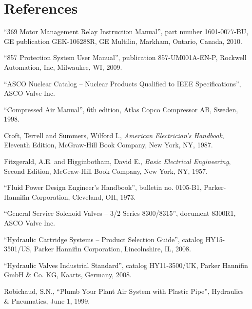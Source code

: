 \filbreak
\section*{References}


\noindent
``369 Motor Management Relay Instruction Manual'', part number 1601-0077-BU, GE publication GEK-106288R, GE Multilin, Markham, Ontario, Canada, 2010.

\vskip 10pt

\noindent
``857 Protection System User Manual'', publication 857-UM001A-EN-P, Rockwell Automation, Inc, Milwaukee, WI, 2009.

\vskip 10pt

\noindent
``ASCO Nuclear Catalog -- Nuclear Products Qualified to IEEE Specifications'', ASCO Valve Inc.

\vskip 10pt

\noindent
``Compressed Air Manual'', 6th edition, Atlas Copco Compressor AB, Sweden, 1998.

\vskip 10pt

\noindent
Croft, Terrell and Summers, Wilford I., \textit{American Electrician's Handbook}, Eleventh Edition, McGraw-Hill Book Company, New York, NY, 1987.

\vskip 10pt

\noindent
Fitzgerald, A.E. and Higginbotham, David E., \textit{Basic Electrical Engineering}, Second Edition, McGraw-Hill Book Company, New York, NY, 1957.

\vskip 10pt

\noindent
``Fluid Power Design Engineer's Handbook'', bulletin no. 0105-B1, Parker-Hannifin Corporation, Cleveland, OH, 1973.

\vskip 10pt

\noindent
``General Service Solenoid Valves -- 3/2 Series 8300/8315'', document 8300R1, ASCO Valve Inc.

\vskip 10pt

\noindent
``Hydraulic Cartridge Systems -- Product Selection Guide'', catalog HY15-3501/US, Parker Hannifin Corporation, Lincolnshire, IL, 2008.

\vskip 10pt

\noindent
``Hydraulic Valves Industrial Standard'', catalog HY11-3500/UK, Parker Hannifin GmbH \& Co. KG, Kaarts, Germany, 2008.

\vskip 10pt

\noindent
Robichaud, S.N., ``Plumb Your Plant Air System with Plastic Pipe'', Hydraulics \& Pneumatics, June 1, 1999.













